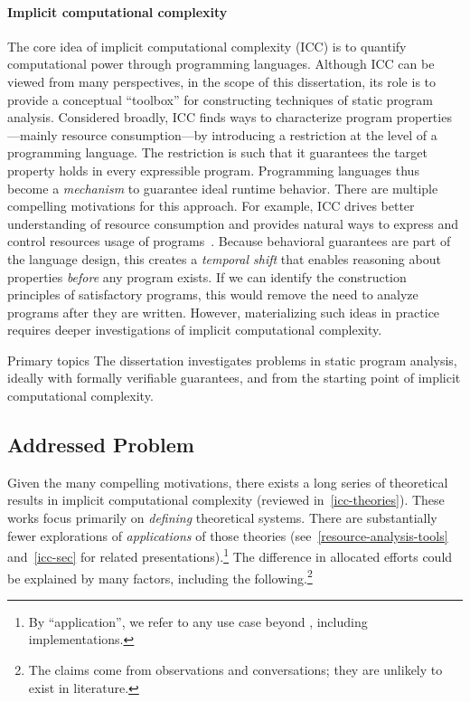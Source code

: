 \paragraph*{Implicit computational complexity}
The core idea of implicit computational complexity (ICC) is to quantify
computational power through programming languages. Although ICC can be viewed
from many perspectives, in the scope of this dissertation, its role is to
provide a conceptual \enquote{toolbox} for constructing techniques of static
program analysis. Considered broadly, ICC finds ways to characterize program
properties---mainly resource consumption---by introducing a restriction at the
level of a programming language. The restriction is such that it guarantees the
target property holds in every expressible program. Programming languages thus
become a \emph{mechanism} to guarantee ideal runtime behavior. There are
multiple compelling motivations for this approach. For example, ICC drives
better understanding of resource consumption and provides natural ways to
express and control resources usage of programs~\cite{kristiansen2017}. Because
behavioral guarantees are part of the language design, this creates a
\emph{temporal shift} that enables reasoning about properties \emph{before} any
program exists. If we can identify the construction principles of satisfactory
programs, this would remove the need to analyze programs after they are written.
However, materializing such ideas in practice requires deeper investigations of
implicit computational complexity.

\begin{infobox}[]{Primary topics}
The dissertation investigates problems in {static program analysis}, ideally
with {formally verifiable guarantees}, and from the starting point of {implicit
computational complexity}.
\end{infobox}

\subsection{Addressed Problem}
\label{subsec:problem}

Given the many compelling motivations, there exists a long series of theoretical
results in implicit computational complexity (reviewed
in~\autoref{icc-theories}). These works focus primarily on \emph{defining}
theoretical systems. There are substantially fewer explorations of
\emph{applications} of those theories (see~\autoref{resource-analysis-tools}
and~\autoref{icc-sec} for related presentations).\footnote{By
\enquote{application}, we refer to any use case beyond ,
including implementations.} The difference in allocated efforts could be
explained by many factors, including the following.\footnote{The claims come
from observations and conversations; they are unlikely to exist in literature.}

